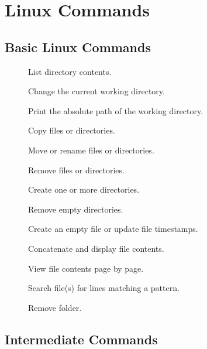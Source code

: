 \chapter{Linux Commands}
\label{ch:linux-commands}

\section{Basic Linux Commands}

\begin{description}
  \item[] List directory contents.
  \item[] Change the current working directory.
  \item[] Print the absolute path of the working directory.
  \item[] Copy files or directories.
  \item[] Move or rename files or directories.
  \item[] Remove files or directories.
  \item[] Create one or more directories.
  \item[] Remove empty directories.
  \item[] Create an empty file or update file timestamps.
  \item[] Concatenate and display file contents.
  \item[] View file contents page by page.
  \item[] Search file(s) for lines matching a pattern.
  \item[] Remove folder.
\end{description}

\section{Intermediate Commands}

